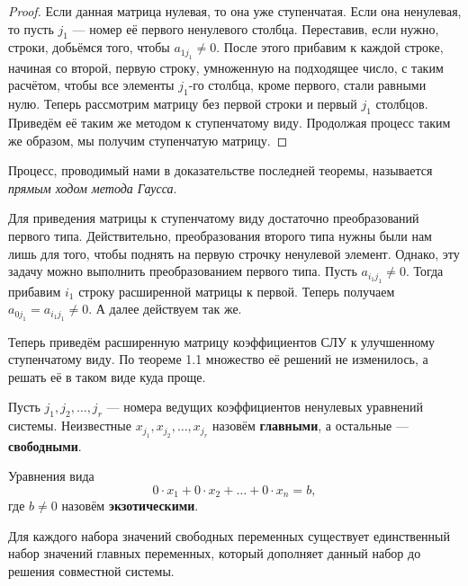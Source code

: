 \begin{proof}
    Если данная матрица нулевая, то она уже ступенчатая. Если она ненулевая, то пусть $j_1$ --- номер её первого ненулевого столбца. Переставив, если нужно, строки, добьёмся того, чтобы $a_{1j_1} \ne 0$. После этого прибавим к каждой строке, начиная со второй, первую строку, умноженную на подходящее число, с таким расчётом, чтобы все элементы $j_1$-го столбца, кроме первого, стали равными нулю. Теперь рассмотрим матрицу без первой строки и первый $j_1$ столбцов. Приведём её таким же методом к ступенчатому виду. Продолжая процесс таким же образом, мы получим ступенчатую матрицу.
\end{proof}

Процесс, проводимый нами в доказательстве последней теоремы, называется \textit{прямым ходом метода Гаусса}.

\begin{remark}
    Для приведения матрицы к ступенчатому виду достаточно преобразований первого типа. Действительно, преобразования второго типа нужны были нам лишь для того, чтобы поднять на первую строчку ненулевой элемент. Однако, эту задачу можно выполнить преобразованием первого типа. Пусть $a_{i_1j_1} \ne 0$. Тогда прибавим $i_1$ строку расширенной матрицы к первой. Теперь получаем $a_{0j_1} = a_{i_1j_1} \ne 0$. А далее действуем так же.
\end{remark}

Теперь приведём расширенную матрицу коэффициентов СЛУ к улучшенному ступенчатому виду. По теореме 1.1 множество её решений не изменилось, а решать её в таком виде куда проще.

\begin{definition}
    Пусть $j_1, j_2, \ldots, j_r$ --- номера ведущих коэффициентов ненулевых уравнений системы. Неизвестные $x_{j_1}, x_{j_2}, \ldots, x_{j_r}$ назовём \textbf{главными}, а остальные --- \textbf{свободными}.
\end{definition}

\begin{definition}
    Уравнения вида
    $$
    0\cdot x_1 + 0\cdot x_2 + \ldots + 0\cdot x_n = b,
    $$
    где $b \ne 0$ назовём \textbf{экзотическими}.
\end{definition}

\begin{theorem}
    Для каждого набора значений свободных переменных существует единственный набор значений главных переменных, который дополняет данный набор до решения совместной системы.
\end{theorem}

